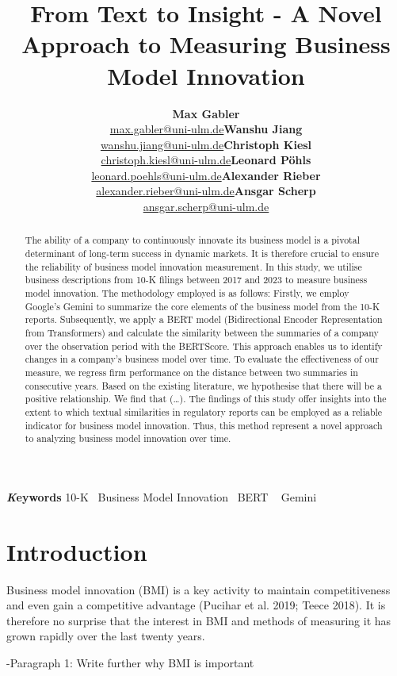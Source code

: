 \documentclass[
]{article}
\title{From Text to Insight - A Novel Approach to Measuring Business
Model Innovation}
\author{\textbf{Max
Gabler}\\\href{mailto:max.gabler@uni-ulm.de}{max.gabler@uni-ulm.de}\asep\textbf{Wanshu
Jiang}\\\href{mailto:wanshu.jiang@uni-ulm.de}{wanshu.jiang@uni-ulm.de}\asep\textbf{Christoph
Kiesl}\\\href{mailto:christoph.kiesl@uni-ulm.de}{christoph.kiesl@uni-ulm.de}\asep\textbf{Leonard
Pöhls}\\\href{mailto:leonard.poehls@uni-ulm.de}{leonard.poehls@uni-ulm.de}\asep\textbf{Alexander
Rieber}\\\href{mailto:alexander.rieber@uni-ulm.de}{alexander.rieber@uni-ulm.de}\asep\textbf{Ansgar
Scherp}\\\href{mailto:ansgar.scherp@uni-ulm.de}{ansgar.scherp@uni-ulm.de}}
\date{}
\begin{document}
\maketitle
\begin{abstract}
The ability of a company to continuously innovate its business model is
a pivotal determinant of long-term success in dynamic markets. It is
therefore crucial to ensure the reliability of business model innovation
measurement. In this study, we utilise business descriptions from 10-K
filings between 2017 and 2023 to measure business model innovation. The
methodology employed is as follows: Firstly, we employ Google's Gemini
to summarize the core elements of the business model from the 10-K
reports. Subsequently, we apply a BERT model (Bidirectional Encoder
Representation from Transformers) and calculate the similarity between
the summaries of a company over the observation period with the
BERTScore. This approach enables us to identify changes in a company's
business model over time. To evaluate the effectiveness of our measure,
we regress firm performance on the distance between two summaries in
consecutive years. Based on the existing literature, we hypothesise that
there will be a positive relationship. We find that (\ldots). The
findings of this study offer insights into the extent to which textual
similarities in regulatory reports can be employed as a reliable
indicator for business model innovation. Thus, this method represent a
novel approach to analyzing business model innovation over time.
\end{abstract}
{\bfseries \emph Keywords}
\def\sep{\textbullet\ }
10-K \sep Business Model Innovation \sep BERT \sep 
Gemini


\newpage{}

\section{Introduction}\label{introduction}

Business model innovation (BMI) is a key activity to maintain
competitiveness and even gain a competitive advantage (Pucihar et al.
2019; Teece 2018). It is therefore no surprise that the interest in BMI
and methods of measuring it has grown rapidly over the last twenty
years.

-Paragraph 1: Write further why BMI is important
\end{document}

